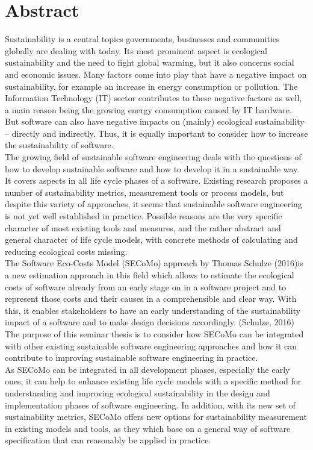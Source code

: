 \chapter{Abstract}
Sustainability is a central topics governments, businesses and communities globally are dealing with today. Its most prominent aspect is ecological sustainability and the need to fight global warming, but it also concerns social and economic issues. Many factors come into play that have a negative impact on sustainability, for example an increase in energy consumption or pollution. The Information Technology (IT) sector contributes to these negative factors as well, a main reason being the growing energy consumption caused by IT hardware. But software can also have negative impacts on (mainly) ecological sustainability – directly and indirectly. Thus, it is equally important to consider how to increase the sustainability of software.\\
The growing field of sustainable software engineering deals with the questions of how to develop sustainable software and how to develop it in a sustainable way. It covers aspects in all life cycle phases of a software. Existing research proposes a number of sustainability metrics, measurement tools or process models, but despite this variety of approaches, it seems that sustainable software engineering is not yet well established in practice. Possible reasons are the very specific character of most existing tools and measures, and the rather abstract and general character of life cycle models, with concrete methods of calculating and reducing ecological costs missing.\\
The Software Eco-Costs Model (SECoMo) approach by Thomas Schulze (2016)is a new estimation approach in this field which allows to estimate the ecological costs of software already from an early stage on in a software project and to represent those costs and their causes in a comprehensible and clear way. With this, it enables stakeholders to have an early understanding of the sustainability impact of a software and to make design decisions accordingly. (Schulze, 2016) %
\\ %
The purpose of this seminar thesis is to consider how SECoMo can be integrated with other existing sustainable software engineering approaches and how it can contribute to improving sustainable software engineering in practice.\\
As SECoMo can be integrated in all development phases, especially the early ones, it can help to enhance existing life cycle models with a specific method for understanding and improving ecological sustainability in the design and implementation phases of software engineering. In addition, with its new set of sustainability metrics, SECoMo offers new options for sustainability measurement in existing models and tools, as they which base on a general way of software specification that can reasonably be applied in practice.